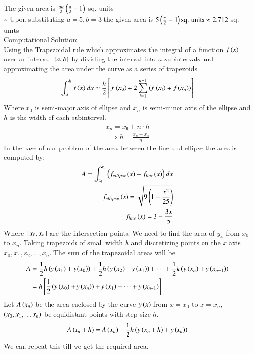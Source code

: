 \documentclass[journal]{IEEEtran}
\begin{document}
The given area is $\frac{ab}{2}\left(\frac{\pi}{2}-1\right)$ sq. units\\
$\therefore$ Upon substituting $a=5,b=3$ the given area is $5\left(\frac{\pi}{2}-1\right)\text{sq. units}\approx2.712$ sq. units\\
\newline
Computational Solution:\\
Using the Trapezoidal rule which approximates the integral of a function $f\left(x\right)$ over an interval ${}\left[a,b\right]$ by dividing the interval into $n$ subintervals and approximating the area under the curve as a series of trapezoids
\begin{align}
    \int_a^b f\left(x\right)dx\approx\frac{h}{2}{}\left[f\left(x_0\right)+2\sum_{i=1}^{n-1}\left(f\left(x_i\right)+f\left(x_n\right)\right)\right]
\end{align}
Where $x_0$ is semi-major axis of ellipse and $x_n$ is semi-minor axis of the ellipse and $h$ is the width of each subinterval.
\begin{align}
    x_n=x_0+n\cdot h\\
    \implies h=\frac{x_n-x_0}{n}
\end{align}
In the case of our problem of the area between the line and ellipse the area is computed by:
\begin{align}
    A=\int_{x_{0}}^{x_{n}}\left(f_{ellipse}\left(x\right)-f_{line}\left(x\right)\right)dx\\
    f_{ellipse}\left(x\right)=\sqrt{9\left(1-\frac{x^2}{25}\right)}\\
    f_{line}\left(x\right)=3-\frac{3x}{5}
\end{align}
Where ${}\left[x_{0},x_{n}\right]$ are the intersection points. We need to find the area of $y_x$ from $x_0$ to $x_n$. Taking trapezoids of small width $h$ and discretizing points on the $x$ axis $x_0, x_1, x_2, \dots, x_n$. The sum of the trapezoidal areas will be
\begin{align}
    A&=\frac{1}{2}h\left(y\left(x_1\right)+y\left(x_0\right)\right)+ \frac{1}{2}h\left(y\left(x_2\right)+y\left(x_1\right)\right)+\dots+\frac{1}{2}h\left(y\left(x_n\right)+y\left(x_{n-1}\right)\right)\\
  &=h{}\left[\frac{1}{2}\left(y\left(x_0\right)+y\left(x_n\right)\right)+ y\left(x_1\right)+\dots+y\left(x_{n-1}\right)\right]
\end{align}
Let $A\left(x_n\right)$ be the area enclosed by the curve $y\left(x\right)$ from $x=x_0$ to $x=x_n$, $\left(x_0, x_1, \dots x_n\right)$ be equidistant points with step-size $h$.
\begin{align}
  A\left(x_n+h\right)=A\left(x_n\right)+\frac{1}{2}h\left(y\left(x_n+h\right)+y\left(x_n\right)\right)
\end{align}
We can repeat this till we get the required area.\\
\end{document}
